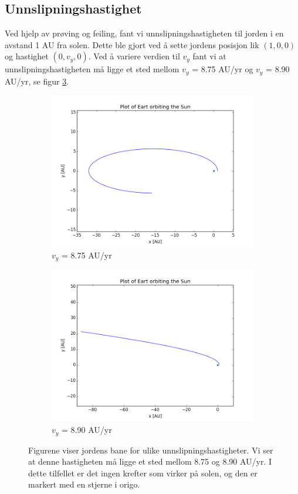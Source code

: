 \documentclass[11pt,a4paper]{article}
\begin{document}
\subsection{Unnslipningshastighet}
Ved hjelp av prøving og feiling, fant vi unnslipningshastigheten til jorden i en avstand 1 AU fra solen. Dette ble gjort ved å sette jordens posisjon lik $(1,0,0)$ og hastighet $(0,v_y,0)$. Ved å variere verdien til $v_y$ fant vi at unnslipningshastigheten må ligge et sted mellom $v_y$ = 8.75 AU/yr og $v_y$ = 8.90 AU/yr, se figur \ref{fig:uh}. 

\FloatBarrier
\begin{figure}[!ht]
\centering
\begin{subfigure}{.5\textwidth}
  \centering
  \includegraphics[width=1.1\linewidth]{3d_escape_v_8_75.png}
  \caption{$v_y$ = 8.75 AU/yr}
  \label{fig:sub1}
\end{subfigure}%
\begin{subfigure}{.5\textwidth}
  \centering
  \includegraphics[width=1.1\linewidth]{3d_escape_v_8_9.png}
  \caption{$v_y$ = 8.90 AU/yr}
  \label{fig:sub2}
\end{subfigure}
\caption{Figurene viser jordens bane for ulike unnslipningshastigheter. Vi ser at denne hastigheten må ligge et sted mellom 8.75 og 8.90 AU/yr. I dette tilfellet er det ingen krefter som virker på solen, og den er markert med en stjerne i origo.}
\label{fig:uh}
\end{figure}
\end{document}
